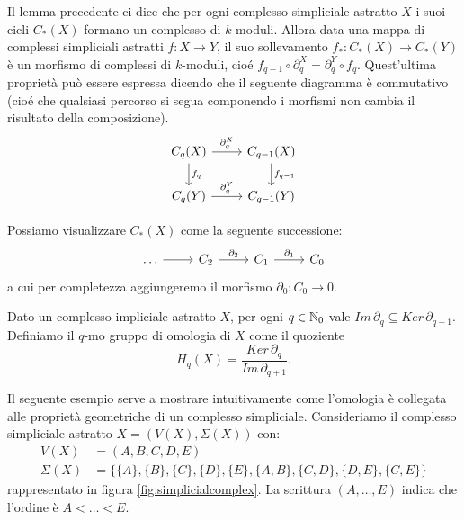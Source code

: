 \begin{rmk}
  Il lemma precedente ci dice che per ogni complesso simpliciale astratto $X$ i suoi cicli $C_*(X)$ formano un complesso di $k$-moduli. Allora data una mappa di complessi simpliciali astratti $f:X\to Y$, il suo sollevamento $f_*:C_*(X)\to C_*(Y)$ è un morfismo di complessi di $k$-moduli, cioé $f_{q-1}\circ \partial^X_q=\partial^Y_q\circ f_q$. Quest'ultima proprietà può essere espressa dicendo che il seguente diagramma è commutativo (cioé che qualsiasi percorso si segua componendo i morfismi non cambia il risultato della composizione).
  \begin{equation*}
    \begin{tikzcd}
      C_q(X)\arrow[r,"\partial^X_q"]\arrow[d,"f_q"]
        &C_{q-1}(X)\arrow[d,"f_{q-1}"]\\
      C_q(Y)\arrow[r,"\partial^Y_q"]&C_{q-1}(Y)
    \end{tikzcd}
  \end{equation*}

  Possiamo visualizzare $C_*(X)$ come la seguente successione:
  \begin{equation*}
    \begin{tikzcd}
      \dots \arrow{r}&
        C_2\arrow{r}{\partial_2}&
          C_1\arrow{r}{\partial_1}&
            C_0
    \end{tikzcd}
  \end{equation*}
  a cui per completezza aggiungeremo il morfismo $\partial_0:C_0\to 0$.
\end{rmk}

\begin{definition}
  Dato un complesso impliciale astratto $X$, per ogni $q\in\mathbb{N}_0$ vale $Im\,\partial_q \subseteq Ker\,\partial_{q-1}$. Definiamo il $q$-mo gruppo di omologia di $X$ come il quoziente
  \begin{equation*}
    H_q(X) = \frac{Ker\,\partial_q}{Im\,\partial_{q+1}}.
  \end{equation*}
\end{definition}

Il seguente esempio serve a mostrare intuitivamente come l'omologia è collegata alle proprietà geometriche di un complesso simpliciale. Consideriamo il complesso simpliciale astratto $X=(V(X),\Sigma(X))$ con:
\begin{align*}
  V(X) &= ( A,B,C,D,E )\\
  \Sigma(X) &= \{ \{A\}, \{B\}, \{C\}, \{D\}, \{E\}, \{A,B\}, \{C,D\}, \{D,E\}, \{C,E\} \}
\end{align*}
rappresentato in figura \cref{fig:simplicialcomplex}. La scrittura $(A,\dots,E)$ indica che l'ordine è $A<\dots<E$.

